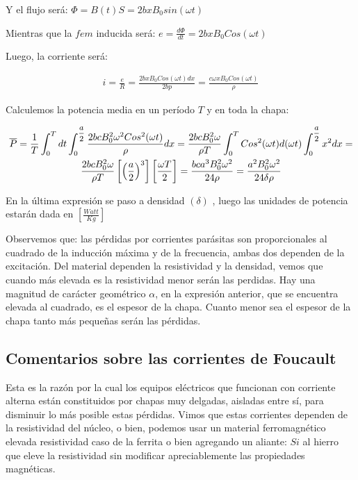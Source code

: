 Y el flujo será:
$\Phi = B(t)S = 2 b x B_{0} sin(\omega t)$

Mientras que la $fem$ inducida será:
$e = \frac{d\Phi}{dt} = 2 b x B_{0} Cos(\omega t)$

Luego, la corriente será:

\begin{equation}
\begin{aligned}
i= \frac{e}{R} = \frac{2 b x B_{0} Cos(\omega t) dx}{2bp} = \frac{c \omega x B_{0} Cos(\omega t)}{\rho}
\end{aligned}
\end{equation}

Calculemos la potencia media en un período $T$ y en toda la chapa:

\begin{multline}
\overline{P}= \frac{1}{T}\int_{0}^{T}dt\int_{0}^{\mfrac{a}{2}} \frac{2 b c B_{0}^{2}\omega^{2}Cos^{2}(\omega t)}{\rho}dx
 =  \frac{2 b c B_{0}^{2}\omega}{\rho T} \int_{0}^{T} Cos^{2}(\omega t) d(\omega t) \int_{0}^{\mfrac{a}{2}}x^{2} dx = \\
\frac{2 b c B_{0}^{2}\omega}{\rho T} \left[ \left( \frac{a}{2}\right)^{3} \right] \left[ \frac{\omega T}{2} \right] = \frac{b c a^{3} B_{0}^{2} \omega^{2}}{24 \rho} = \frac{a^{2} B_{0}^{2} \omega^{2}}{24 \delta \rho} 
\end{multline}

En la última expresión se paso a densidad $(\delta)$ , luego las unidades de potencia estarán dada en $\left[ \frac{Watt}{Kg}\right] $

Observemos que: las pérdidas por corrientes parásitas son proporcionales al cuadrado de la inducción máxima y de la frecuencia, ambas dos dependen de la excitación. Del material dependen la resistividad y la densidad, vemos que cuando más elevada es la resistividad menor serán las perdidas. Hay una magnitud de carácter geométrico $\alpha$, en la expresión anterior, que se encuentra elevada al cuadrado, es el espesor de la chapa. Cuanto menor sea el espesor de la chapa tanto más pequeñas serán las pérdidas.

\subsection{Comentarios sobre las corrientes de Foucault}

Esta es la razón por la cual los equipos eléctricos que funcionan con corriente alterna están constituidos por chapas muy delgadas, aisladas entre sí, para disminuir lo más posible estas pérdidas. Vimos que estas corrientes dependen de la resistividad del núcleo, o bien, podemos usar un material ferromagnético elevada resistividad caso de la ferrita o bien agregando un aliante: $Si$ al hierro que eleve la resistividad sin modificar apreciablemente las propiedades magnéticas. 

